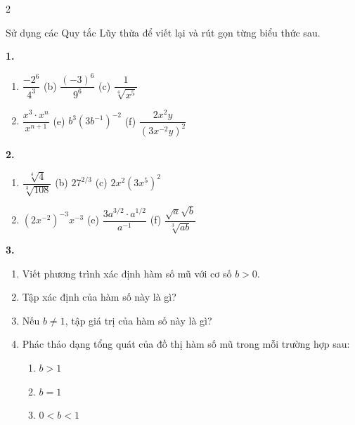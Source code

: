 \fancyhf{}
\renewcommand{\headrulewidth}{0pt}

\vspace{0.8em}

\begin{multicols}{2}
\fontsize{8.2pt}{10.2pt}\selectfont
\setlength{\abovedisplayskip}{1.5pt}
\setlength{\belowdisplayskip}{1.5pt}



\quad Sử dụng các Quy tắc Lũy thừa để viết lại và rút gọn từng biểu thức sau.

\vspace{0.3em}
\noindent\textbf{1.}
\begin{enumerate}[label=(\alph*),leftmargin=*,itemsep=2pt,topsep=1pt]
\item $\dfrac{-2^6}{4^3}$ \hfill (b) $\dfrac{(-3)^6}{9^6}$ \hfill (c) $\dfrac{1}{\sqrt[4]{x^5}}$
\item $\dfrac{x^3 \cdot x^n}{x^{n+1}}$ \hfill (e) $b^3(3b^{-1})^{-2}$ \hfill (f) $\dfrac{2x^2 y}{(3x^{-2} y)^2}$
\end{enumerate}

\vspace{0.3em}
\noindent\textbf{2.}
\begin{enumerate}[label=(\alph*),leftmargin=*,itemsep=2pt,topsep=1pt]
\item $\dfrac{\sqrt[4]{4}}{\sqrt[3]{108}}$ \hfill (b) $27^{2/3}$ \hfill (c) $2x^2(3x^5)^2$
\item $(2x^{-2})^{-3} x^{-3}$ \hfill (e) $\dfrac{3a^{3/2} \cdot a^{1/2}}{a^{-1}}$ \hfill (f) $\dfrac{\sqrt{a}\sqrt{b}}{\sqrt[3]{ab}}$
\end{enumerate}

\vspace{0.6em}
\noindent\textbf{3.}
\begin{enumerate}[label=(\alph*),leftmargin=*,itemsep=2pt,topsep=1pt]
\item Viết phương trình xác định hàm số mũ với cơ số $b > 0$.
\item Tập xác định của hàm số này là gì?
\item Nếu $b \neq 1$, tập giá trị của hàm số này là gì?
\item Phác thảo dạng tổng quát của đồ thị hàm số mũ trong mỗi trường hợp sau:
\begin{enumerate}[label=(\roman*),leftmargin=1.5em,itemsep=1pt]
\item $b > 1$
\item $b = 1$
\item $0 < b < 1$
\end{enumerate}
\end{enumerate}


\end{multicols}
